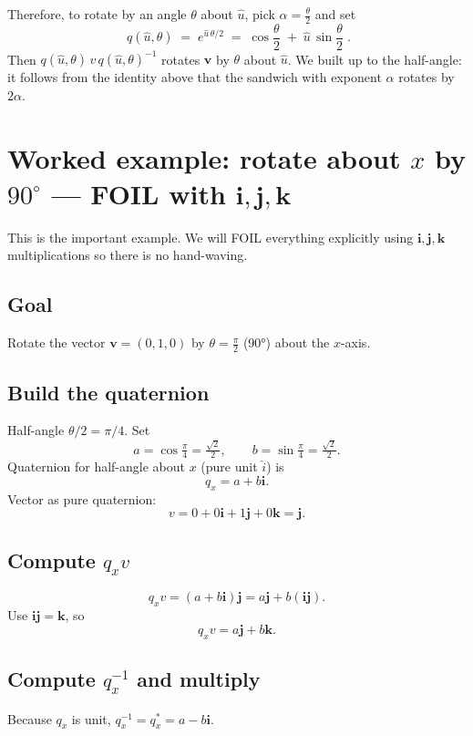 \documentclass[11pt]{article}
\begin{document}
Therefore, to rotate by an angle \(\theta\) about \(\hat{u}\), pick \(\alpha=\tfrac{\theta}{2}\)
and set
\[
\boxed{ \; q(\hat{u},\theta) \;=\; e^{\hat{u}\,\theta/2}
           \;=\; \cos\frac{\theta}{2} \;+\; \hat{u}\,\sin\frac{\theta}{2} \; }.
\]
Then \(q(\hat{u},\theta)\, v\, q(\hat{u},\theta)^{-1}\) rotates \(\mathbf{v}\) by \(\theta\)
about \(\hat{u}\). We built up to the half-angle: it follows from the identity above
that the sandwich with exponent \( \alpha \) rotates by \(2\alpha\).

\section{Worked example: rotate about \(x\) by \(90^\circ\) — FOIL with \(\mathbf{i},\mathbf{j},\mathbf{k}\)}
This is the important example. We will FOIL everything explicitly using
\(\mathbf{i},\mathbf{j},\mathbf{k}\) multiplications so there is no hand-waving.

\subsection{Goal}
Rotate the vector \(\mathbf{v}=(0,1,0)\) by \(\theta=\tfrac{\pi}{2}\) (90°) about the \(x\)-axis.

\subsection{Build the quaternion}
Half-angle \(\theta/2=\pi/4\). Set
\[
a=\cos\tfrac{\pi}{4}=\tfrac{\sqrt{2}}{2},\qquad b=\sin\tfrac{\pi}{4}=\tfrac{\sqrt{2}}{2}.
\]
Quaternion for half-angle about \(x\) (pure unit \(\hat{i}\)) is
\[
q_x = a + b\mathbf{i}.
\]
Vector as pure quaternion:
\[
v = 0 + 0\mathbf{i} + 1\mathbf{j} + 0\mathbf{k} = \mathbf{j}.
\]

\subsection{Compute \(q_x v\)}
\[
q_x v = (a + b\mathbf{i})\mathbf{j} = a\mathbf{j} + b(\mathbf{i}\mathbf{j}).
\]
Use \(\mathbf{i}\mathbf{j}=\mathbf{k}\), so
\[
q_x v = a\mathbf{j} + b\mathbf{k}.
\]

\subsection{Compute \(q_x^{-1}\) and multiply}
Because \(q_x\) is unit, \(q_x^{-1}=q_x^{*}=a - b\mathbf{i}\).
\end{document}

